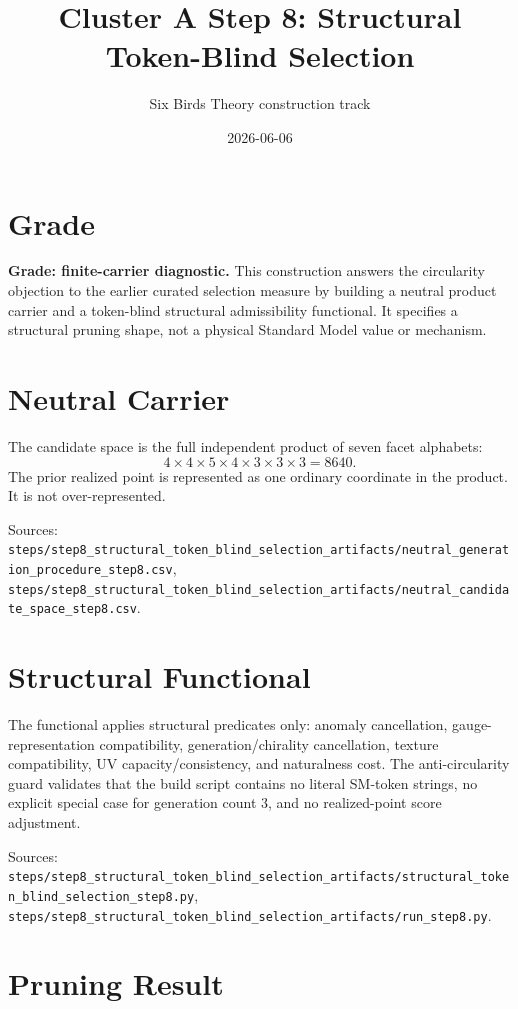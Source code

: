 \documentclass[11pt]{article}
\title{Cluster A Step 8: Structural Token-Blind Selection}
\author{Six Birds Theory construction track}
\date{2026-06-06}
\begin{document}
\maketitle

\section{Grade}

\textbf{Grade: finite-carrier diagnostic.}
This construction answers the circularity objection to the earlier curated selection measure by building a neutral product carrier and a token-blind structural admissibility functional. It specifies a structural pruning shape, not a physical Standard Model value or mechanism.

\section{Neutral Carrier}

The candidate space is the full independent product of seven facet alphabets:
\[
4 \times 4 \times 5 \times 4 \times 3 \times 3 \times 3 = 8640.
\]
The prior realized point is represented as one ordinary coordinate in the product. It is not over-represented.

Sources: \texttt{steps/step8\_structural\_token\_blind\_selection\_artifacts/neutral\_generation\_procedure\_step8.csv}, \texttt{steps/step8\_structural\_token\_blind\_selection\_artifacts/neutral\_candidate\_space\_step8.csv}.

\section{Structural Functional}

The functional applies structural predicates only: anomaly cancellation, gauge-representation compatibility, generation/chirality cancellation, texture compatibility, UV capacity/consistency, and naturalness cost. The anti-circularity guard validates that the build script contains no literal SM-token strings, no explicit special case for generation count \(3\), and no realized-point score adjustment.

Sources: \texttt{steps/step8\_structural\_token\_blind\_selection\_artifacts/structural\_token\_blind\_selection\_step8.py}, \texttt{steps/step8\_structural\_token\_blind\_selection\_artifacts/run\_step8.py}.

\section{Pruning Result}
\end{document}
